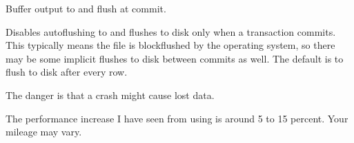 \documentclass[letterpaper,10pt,english]{sphinxmanual}
\begin{document}

\begin{fulllineitems}
\label{\detokenize{mariadb-archiver:cmdoption-mariadb-archiver-buffer}}
\sphinxAtStartPar
Buffer output to {\hyperref[\detokenize{mariadb-archiver:cmdoption-mariadb-archiver-file}]{}} and flush at commit.

\sphinxAtStartPar
Disables autoflushing to {\hyperref[\detokenize{mariadb-archiver:cmdoption-mariadb-archiver-file}]{}} and flushes {\hyperref[\detokenize{mariadb-archiver:cmdoption-mariadb-archiver-file}]{}} to disk only when a
transaction commits.  This typically means the file is block\sphinxhyphen{}flushed by the
operating system, so there may be some implicit flushes to disk between
commits as well.  The default is to flush {\hyperref[\detokenize{mariadb-archiver:cmdoption-mariadb-archiver-file}]{}} to disk after every row.

\sphinxAtStartPar
The danger is that a crash might cause lost data.

\sphinxAtStartPar
The performance increase I have seen from using {\hyperref[\detokenize{mariadb-archiver:cmdoption-mariadb-archiver-buffer}]{}} is around 5 to 15
percent.  Your mileage may vary.

\end{fulllineitems}

\end{document}
